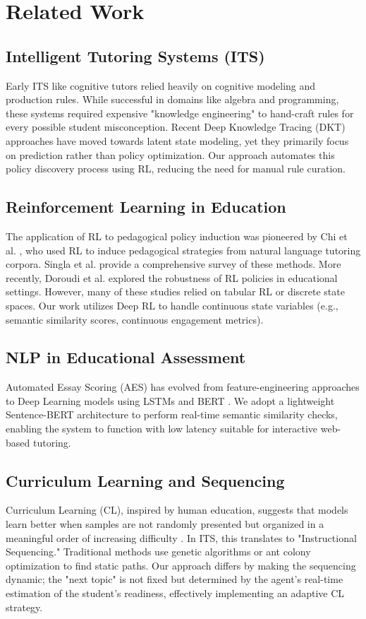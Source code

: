 \documentclass[conference]{IEEEtran}
\begin{document}
\section{Related Work}

\subsection{Intelligent Tutoring Systems (ITS)}
Early ITS like cognitive tutors \cite{koedinger1997} relied heavily on cognitive modeling and production rules. While successful in domains like algebra and programming, these systems required expensive "knowledge engineering" to hand-craft rules for every possible student misconception. Recent Deep Knowledge Tracing (DKT) approaches \cite{piech2015} have moved towards latent state modeling, yet they primarily focus on prediction rather than policy optimization. Our approach automates this policy discovery process using RL, reducing the need for manual rule curation.

\subsection{Reinforcement Learning in Education}
The application of RL to pedagogical policy induction was pioneered by Chi et al. \cite{chi2011}, who used RL to induce pedagogical strategies from natural language tutoring corpora. Singla et al. \cite{singla2021} provide a comprehensive survey of these methods. More recently, Doroudi et al. \cite{doroudi2019} explored the robustness of RL policies in educational settings. However, many of these studies relied on tabular RL or discrete state spaces. Our work utilizes Deep RL to handle continuous state variables (e.g., semantic similarity scores, continuous engagement metrics).

\subsection{NLP in Educational Assessment}
Automated Essay Scoring (AES) has evolved from feature-engineering approaches to Deep Learning models using LSTMs and BERT \cite{alqaraghuli2020}. We adopt a lightweight Sentence-BERT architecture to perform real-time semantic similarity checks, enabling the system to function with low latency suitable for interactive web-based tutoring.

\subsection{Curriculum Learning and Sequencing}
Curriculum Learning (CL), inspired by human education, suggests that models learn better when samples are not randomly presented but organized in a meaningful order of increasing difficulty \cite{bengio2009}. In ITS, this translates to "Instructional Sequencing." Traditional methods use genetic algorithms or ant colony optimization to find static paths. Our approach differs by making the sequencing dynamic; the "next topic" is not fixed but determined by the agent's real-time estimation of the student's readiness, effectively implementing an adaptive CL strategy.
\end{document}
